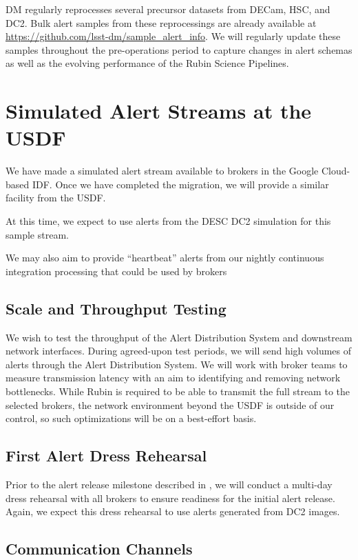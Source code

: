 \documentclass[DM,authoryear,toc]{lsstdoc}
\begin{document}
DM regularly reprocesses several precursor datasets from DECam, HSC, and DC2.
Bulk alert samples from these reprocessings are already available at \url{https://github.com/lsst-dm/sample_alert_info}.
We will regularly update these samples throughout the pre-operations period to capture changes in alert schemas as well as the evolving performance of the Rubin Science Pipelines.

\section{Simulated Alert Streams at the USDF}

We have made a simulated alert stream available to brokers in the Google Cloud-based IDF.
Once we have completed the migration, we will provide a similar facility from the USDF.

At this time, we expect to use alerts from the DESC DC2 simulation for this sample stream.

We may also aim to provide ``heartbeat'' alerts from our nightly continuous integration processing that could be used by brokers 

\subsection{Scale and Throughput Testing}

We wish to test the throughput of the Alert Distribution System and downstream network interfaces.
During agreed-upon test periods, we will send high volumes of alerts through the Alert Distribution System.
We will work with broker teams to measure transmission latency with an aim to identifying and removing network bottlenecks.
While Rubin is required to be able to transmit the full stream to the selected brokers, the network environment beyond the USDF is outside of our control, so such optimizations will be on a best-effort basis.

\subsection{First Alert Dress Rehearsal}

Prior to the alert release milestone described in , we will conduct a multi-day dress rehearsal with all brokers to ensure readiness for the initial alert release.  
Again, we expect this dress rehearsal to use alerts generated from DC2 images.

\subsection{Communication Channels}
\end{document}
